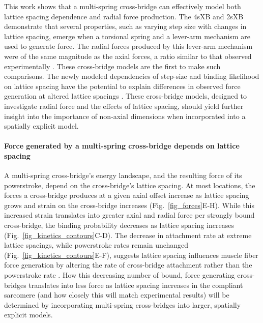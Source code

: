 \documentclass[]{article}
\begin{document}
This work shows that a multi-spring cross-bridge can effectively model both lattice spacing dependence and radial force production. 
The 4sXB and 2sXB demonstrate that several properties, such as varying step size with changes in lattice spacing, emerge when a torsional spring and a lever-arm mechanism are used to generate force. 
The radial forces produced by this lever-arm mechanism were of the same magnitude as the axial forces, a ratio similar to that observed experimentally \citep{Cecchi1990,Brenner1991}. 
These cross-bridge models are the first to make such comparisons.
The newly modeled dependencies of step-size and binding likelihood on lattice spacing have the potential to explain differences in observed force generation at altered lattice spacings  \citep{Millman1998}. 
These cross-bridge models, designed to investigate radial force and the effects of lattice spacing, should yield further insight into the importance of non-axial dimensions when incorporated into a spatially explicit model. 

\paragraph{Force generated by a multi-spring cross-bridge depends on lattice spacing} %
A multi-spring cross-bridge's energy landscape, and the resulting force of its powerstroke, depend on the cross-bridge's lattice spacing.
At most locations, the forces a cross-bridge produces at a given axial offset increase as lattice spacing grows and strain on the cross-bridge increases (Fig.~\ref{fig_forces}E-H). 
While this increased strain translates into greater axial and radial force per strongly bound cross-bridge, the binding probability decreases as lattice spacing increases (Fig.~\ref{fig_kinetics_contours}C-D).
The decrease in attachment rate at extreme lattice spacings, while powerstroke rates remain unchanged (Fig.~\ref{fig_kinetics_contours}E-F), suggests lattice spacing influences muscle fiber force generation by altering the rate of cross-bridge attachment rather than the powerstroke rate \citep{Martyn2004}. 
How this decreasing number of bound, force generating cross-bridges translates into less force as lattice spacing increases in the compliant sarcomere (and how closely this will match experimental results) will be determined by incorporating multi-spring cross-bridges into larger, spatially explicit models. %
\end{document}
